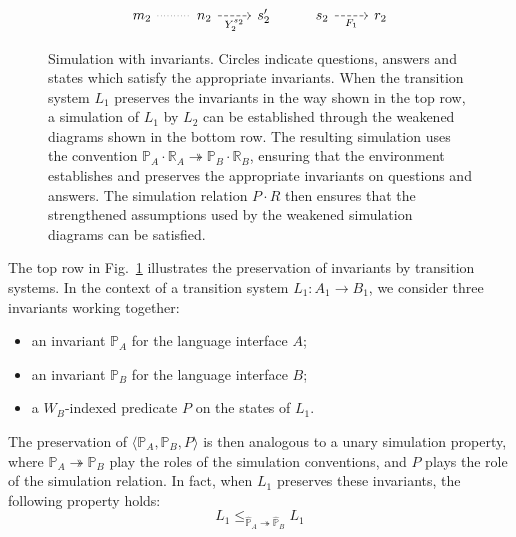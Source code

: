 \documentclass[11pt,oneside,draft]{book}
\theoremstyle{definition}
\begin{document}
\begin{figure}
\[\begin{tikzcd}
      |[alias=X22]| m_2 \ar[r, dotted, dash] &
      |[alias=Y12]| n_2 \ar[r, "Y_2^{s_2}"', dashed] &
      |[alias=Y22]| s_2' &
      |[alias=F12]| s_2 \ar[r, "F_1"', dashed] &
      |[alias=F22]| r_2
    \end{tikzcd}
  \]
  \caption[Simulation with invariants]%
   {Simulation with invariants.
    Circles indicate questions, answers and states
    which satisfy the appropriate invariants.
    When the transition system $L_1$ preserves the invariants
    in the way shown in the top row,
    a simulation of $L_1$ by $L_2$ can be established through
    the weakened diagrams shown in the bottom row.
    The resulting simulation uses the convention
    $\mathbb{P}_A \cdot \mathbb{R}_A \twoheadrightarrow
     \mathbb{P}_B \cdot \mathbb{R}_B$,
    ensuring that the environment
    establishes and preserves the appropriate invariants
    on questions and answers.
    The simulation relation $P \cdot R$ then ensures that
    the strengthened assumptions used by the
    weakened simulation diagrams can be satisfied.}
  \label{fig:fsim-inv}
\end{figure}

The top row in Fig.~\ref{fig:fsim-inv}
illustrates the preservation of invariants by transition systems.
In the context of a transition system
$L_1 : A_1 \rightarrow B_1$,
we consider three invariants working together:
\begin{itemize}
  \item an invariant $\mathbb{P}_A$ for the language interface $A$;
  \item an invariant $\mathbb{P}_B$ for the language interface $B$;
  \item a $W_B$-indexed predicate $P$ on the states of $L_1$.
\end{itemize}
The preservation of
$\langle \mathbb{P}_A, \mathbb{P}_B, P \rangle$
is then analogous to a unary simulation property,
where $\mathbb{P}_A \twoheadrightarrow \mathbb{P}_B$
play the roles of the simulation conventions,
and $P$ plays the role of the simulation relation.
In fact,
when $L_1$ preserves these invariants,
the following property holds:
\[
    L_1 \le_{\hat{\mathbb{P}}_A \twoheadrightarrow \hat{\mathbb{P}}_B} L_1
\]
\end{document}
